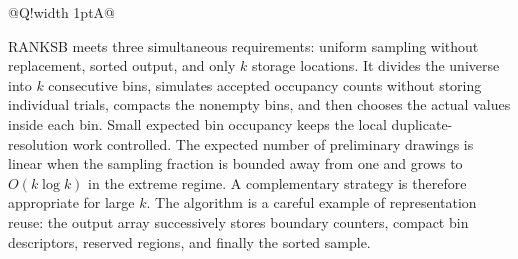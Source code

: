 \documentclass[10pt,letterpaper]{article}
\begin{document}
\begin{longtable}{@{}Q!{\color{Mist}\vrule width 1pt}A@{}}
\end{longtable}
\begin{tcolorbox}[colback=Ink!4,colframe=Ink,title=Cornell summary]
RANKSB meets three simultaneous requirements: uniform sampling without replacement, sorted output, and only $k$ storage locations. It divides the universe into $k$ consecutive bins, simulates accepted occupancy counts without storing individual trials, compacts the nonempty bins, and then chooses the actual values inside each bin. Small expected bin occupancy keeps the local duplicate-resolution work controlled. The expected number of preliminary drawings is linear when the sampling fraction is bounded away from one and grows to $O(k\log k)$ in the extreme regime. A complementary strategy is therefore appropriate for large $k$. The algorithm is a careful example of representation reuse: the output array successively stores boundary counters, compact bin descriptors, reserved regions, and finally the sorted sample.
\end{tcolorbox}
\end{document}
